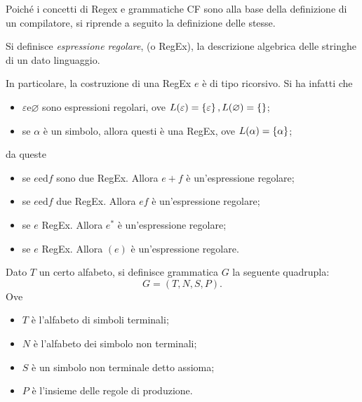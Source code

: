 \documentclass{subfiles}
\begin{document}
Poiché i concetti di Regex e grammatiche CF sono alla base della definizione di un compilatore,
si riprende a seguito la definizione delle stesse.
\begin{Definition*}
    Si definisce \emph{espressione regolare}, (o RegEx), la descrizione algebrica delle stringhe di un dato linguaggio.
\end{Definition*}
\noindent In particolare, la costruzione di una RegEx $e$ è di tipo ricorsivo. Si ha infatti che
\begin{itemize}
    \item $\varepsilon \text{e} \varnothing$ sono espressioni regolari, ove $L(\varepsilon) = \Set{\varepsilon}, L(\varnothing) = \Set{}$;
    \item se $\alpha$ è un simbolo, allora questi è una RegEx, ove $L(\alpha) = \Set{\alpha}$;
\end{itemize}
da queste
\begin{itemize}
    \item se $e \text{ed} f$ sono due RegEx. Allora $e + f$ è un'espressione regolare;
    \item se $e \text{ed} f$ due RegEx. Allora $ef$ è un'espressione regolare;
    \item se $e$ RegEx. Allora $e^{*}$ è un'espressione regolare;
    \item se $e$ RegEx. Allora $(e)$ è un'espressione regolare.
\end{itemize}

\begin{Definition*}
    Dato $T$ un certo alfabeto, si definisce grammatica $G$ la seguente quadrupla:
    \[
        G = (T, N, S, P).
    \]
    Ove
    \begin{itemize}
        \item $T$ è l'alfabeto di simboli terminali;
        \item $N$ è l'alfabeto dei simbolo non terminali;
        \item $S$ è un simbolo non terminale detto assioma;
        \item $P$ è l'insieme delle regole di produzione.
    \end{itemize}
\end{Definition*}
\end{document}
